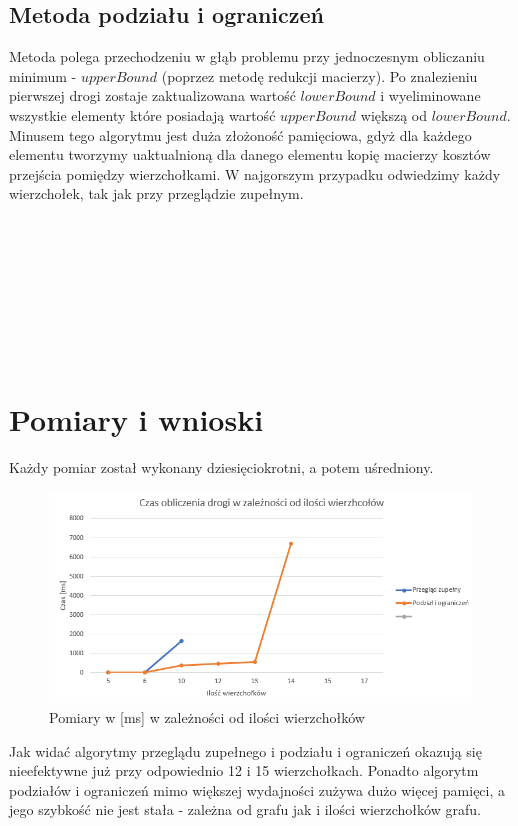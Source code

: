 \documentclass{article}
\begin{document}
\subsection{Metoda podziału i ograniczeń}

Metoda polega przechodzeniu w głąb problemu przy jednoczesnym obliczaniu minimum - $upperBound$ (poprzez metodę redukcji macierzy). Po znalezieniu pierwszej drogi zostaje zaktualizowana wartość $lowerBound$ i wyeliminowane wszystkie elementy które posiadają wartość $upperBound$ większą od $lowerBound$. Minusem tego algorytmu jest duża złożoność pamięciowa, gdyż dla każdego elementu tworzymy uaktualnioną dla danego elementu kopię macierzy kosztów przejścia pomiędzy wierzchołkami. W najgorszym przypadku odwiedzimy każdy wierzchołek, tak jak przy przeglądzie zupełnym.\\\\\\\\\\\\\\\\\\



\section{Pomiary i wnioski}
Każdy pomiar został wykonany dziesięciokrotni, a potem uśredniony.

    	\begin{figure}[h]
			\begin{center}
      			\includegraphics[width=1\textwidth]{./w.jpg}
      				\caption{Pomiary w [ms] w zależności od ilości wierzchołków}
      			\label{fig:obraz}
			\end{center}
		\end{figure}

Jak widać algorytmy przeglądu zupełnego i podziału i ograniczeń okazują się nieefektywne już przy odpowiednio 12 i 15 wierzchołkach. Ponadto algorytm podziałów i ograniczeń mimo większej wydajności zużywa dużo więcej pamięci, a jego szybkość nie jest stała - zależna od grafu jak i ilości wierzchołków grafu. 
\end{document}
